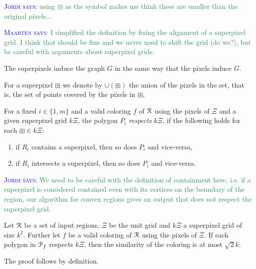 \documentclass[a4paper,UKenglish,cleveref]{lipics-v2019}
\newcommand{\mremark}[3]{\textcolor{blue}{\textsc{#1 #2:}} \textcolor{SeaGreen}{\textsf{#3}}}
\newcommand{\maarten}[2][says]{\mremark{Maarten}{#1}{#2}}
\newcommand{\jordi}[2][says]{\mremark{Jordi}{#1}{#2}}
\newcommand{\pix}{\square}
\newcommand{\spix}{\boxplus}
\begin{document}
\jordi{using $\spix$ as the symbol makes me think these are smaller than the original pixels...}

\maarten {I simplified the definition by fixing the alignment of a superpixel grid. I think that should be fine and we never need to shift the grid (do we?), but be careful with arguments about superpixel grids.}

The superpixels induce the graph $G$ in the same way that the pixels induce $G$.

For a superpixel $\spix$ we denote by $\cup(\spix)$ the union of the pixels in the set, that is, the set of points covered by the pixels in $\spix$.

\begin{definition}
For a fixed $i\in \{1, m\}$ and a valid coloring $f$ of $\cal R$ using the pixels of $\Xi$ and a given superpixel grid $k\Xi$, the polygon $P_i$ \emph{respects} $k\Xi$, if the following holds for each $\spix\in k\Xi$:
\begin{enumerate}
	\item if $R_i$ contains a superpixel, then so does $P_i$ and vice-versa,
	\item if $R_i$ intersects a superpixel, then so does $P_i$ and vice-versa.
\end{enumerate}
\end{definition}

\jordi{We need to be careful with the definition of containment here, i.e. if a superpixel is considered contained even with its vertices on the boundary of the region, our algorithm for convex regions gives an output that does not respect the superpixel grid.}

\begin{lemma}\label{lem:respect_means_bound}
Let $\cal R$ be a set of input regions, $\Xi$ be the unit grid and $k\Xi$ a superpixel grid of size $k^2$. Further let $f$ be a valid coloring of $\cal R$ using the pixels of $\Xi$.
If each polygon in ${\cal P}_f$ respects $k\Xi$, then the similarity of the coloring is at most $\sqrt{2}k$.
\end{lemma}
The proof follows by definition.
\end{document}
